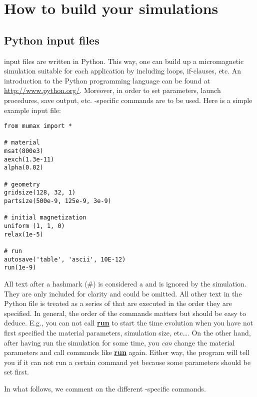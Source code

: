\section{How to build your simulations}

\newcommand{\command}[1]{\hyperref[#1]{\textbf{#1}}\index{#1}\label{#1}}

\subsection{Python input files}
\mumax input files are written in Python. This way, one can build up a micromagnetic simulation suitable for each application by including loops, if-clauses, etc.  An introduction to the Python programming language can be found at \url{http://www.python.org/}.  Moreover, in order to set parameters, launch procedures, save output, etc. \mumax-specific commands are to be used.  Here is a simple example input file: 

\begin{verbatim}
from mumax import *

# material
msat(800e3)
aexch(1.3e-11)
alpha(0.02)

# geometry 
gridsize(128, 32, 1)
partsize(500e-9, 125e-9, 3e-9)

# initial magnetization
uniform	(1, 1, 0)
relax(1e-5)

# run
autosave('table', 'ascii', 10E-12)
run(1e-9)
\end{verbatim}                                                                                                                                            

All text after a hashmark (\#) is considered a  and is ignored by the simulation.  They are only included for clarity and could be omitted.  All other text in the Python file is treated as a series of  that are executed in the order they are specified. In general, the order of the commands matters but should be easy to deduce.  E.g., you can not call \command{run} to start the time evolution when you have not first specified the material parameters, simulation size, etc\ldots. On the other hand, after having {run} the simulation for some time, you \emph{can} change the material parameters and call commands like \command{run} again. Either way, the program will tell you if it can not run a certain command yet because some parameters should be set first.

In what follows, we comment on the different \mumax-specific commands.

